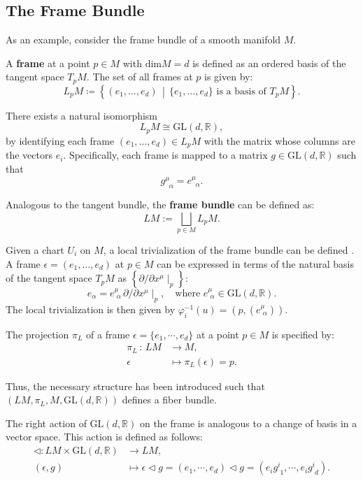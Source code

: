 \subsection{The Frame Bundle}

As an example, consider the frame bundle of a smooth manifold \( M \).

A \textbf{frame} at a point \( p \in M \) with \(\text{dim} M = d\) is defined as an ordered basis of the tangent space \(T_pM\). The set of all frames at \( p \) is given by:
\[
L_pM \coloneqq \left\{ (e_1, \dots, e_d) \,\middle|\, \{e_1, \dots, e_d\} \text{ is a basis of } T_pM \right\}.
\]

There exists a natural isomorphism
\[
L_pM \cong \mathrm{GL}(d, \mathbb{R}),
\]
by identifying each frame \( (e_1, \dots, e_d) \in L_pM \) with the matrix whose columns are the vectors \( e_i \). Specifically, each frame is mapped to a matrix \( g \in \mathrm{GL}(d, \mathbb{R}) \) such that
\[
g^\mu_{\;\;\alpha} = e^\mu_{\;\;\alpha}.
\]

Analogous to the tangent bundle, the \textbf{frame bundle} can be defined as:
\[ LM := \bigsqcup_{p \in M} L_pM. \]

Given a chart \( U_i \) on \( M \), a local trivialization of the frame bundle can be defined \cite{NakaharaGeometrytopologyphysics2005}. A frame \( \epsilon = (e_1, \dots, e_d) \) at \( p \in M \) can be expressed in terms of the natural basis of the tangent space \( T_pM \) as \( \left\{ \partial / \partial x^\mu \mid_p \right\} \):
\[ e_\alpha = e^\mu_{\,\,\alpha} \, \partial/\partial x^\mu \mid_p, \quad \text{where } e^\mu_{\,\,\alpha} \in \mathrm{GL}(d, \mathbb{R}). \]
The local trivialization is then given by \( \varphi_i^{-1}(u)=(p,(e^\mu_{\,\,\alpha})) \).

The projection \( \pi_L \) of a frame \( \epsilon = \{e_1, \cdots, e_d\} \) at a point \( p \in M \) is specified by:
\begin{align*}
  \pi_L \, : \, LM & \longrightarrow M, \\
        \epsilon & \mapsto \pi_L(\epsilon)=p.
\end{align*}

Thus, the necessary structure has been introduced such that \( (LM, \pi_L, M, \text{GL}(d,\mathbb{R})) \) defines a fiber bundle.

The right action of \( \mathrm{GL}(d,\mathbb{R}) \) on the frame is analogous to a change of basis in a vector space. This action is defined as follows:
\begin{align*}
  \triangleleft : LM \times \mathrm{GL}(d,\mathbb{R}) & \longrightarrow LM, \\
  (\epsilon, g) & \mapsto \epsilon \triangleleft g = (e_1, \cdots, e_d) \triangleleft g = (e_i g^i_{\,\,1}, \cdots, e_i g^i_{\,\,d}).
\end{align*}

